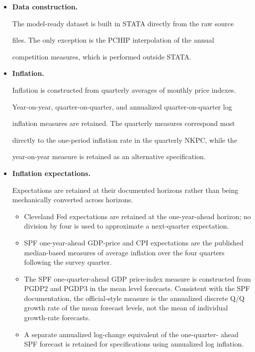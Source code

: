 \documentclass[11pt]{article}
\begin{document}
\begin{itemize}

    \item \textbf{Data construction.}

    The model-ready dataset is built in STATA directly from the raw source

    files. The only exception is the PCHIP interpolation of the annual

    competition measures, which is performed outside STATA.

    \item \textbf{Inflation.}

    Inflation is constructed from quarterly averages of monthly price indexes.

    Year-on-year, quarter-on-quarter, and annualized quarter-on-quarter log

    inflation measures are retained. The quarterly measures correspond most

    directly to the one-period inflation rate in the quarterly NKPC, while the

    year-on-year measure is retained as an alternative specification.

    \item \textbf{Inflation expectations.}

    Expectations are retained at their documented horizons rather than being
    mechanically converted across horizons.

    \begin{itemize}

        \item Cleveland Fed expectations are retained at the one-year-ahead
        horizon; no division by four is used to approximate a next-quarter
        expectation.

        \item SPF one-year-ahead GDP-price and CPI expectations are the
        published median-based measures of average inflation over the four
        quarters following the survey quarter.

        \item The SPF one-quarter-ahead GDP price-index measure is constructed
        from PGDP2 and PGDP3 in the mean level forecasts. Consistent with the
        SPF documentation, the official-style measure is the annualized
        discrete Q/Q growth rate of the mean forecast levels, not the mean of
        individual growth-rate forecasts.

        \item A separate annualized log-change equivalent of the one-quarter-
        ahead SPF forecast is retained for specifications using annualized log
        inflation.


\end{itemize}
\end{itemize}
\end{document}
